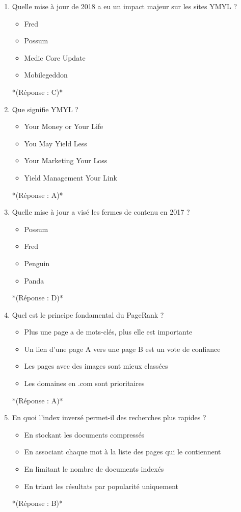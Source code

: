 \documentclass[12pt,a4paper,twoside]{report}
\begin{document}
\begin{enumerate}
\item Quelle mise à jour de 2018 a eu un impact majeur sur les sites YMYL ?
\begin{itemize}
\item[A)] Fred
\item[B)] Possum
\item[C)] Medic Core Update
\item[D)] Mobilegeddon
\end{itemize}
*(Réponse : C)*

\item Que signifie YMYL ?
\begin{itemize}
\item[A)] Your Money or Your Life
\item[B)] You May Yield Less
\item[C)] Your Marketing Your Loss
\item[D)] Yield Management Your Link
\end{itemize}
*(Réponse : A)*

\item Quelle mise à jour a visé les fermes de contenu en 2017 ?
\begin{itemize}
\item[A)] Possum
\item[B)] Fred
\item[C)] Penguin
\item[D)] Panda
\end{itemize}
*(Réponse : D)*

\item Quel est le principe fondamental du PageRank ?
\begin{itemize}
\item[A)] Plus une page a de mots-clés, plus elle est importante
\item[B)] Un lien d'une page A vers une page B est un vote de confiance
\item[C)] Les pages avec des images sont mieux classées
\item[D)] Les domaines en .com sont prioritaires
\end{itemize}
*(Réponse : A)*

\item En quoi l'index inversé permet-il des recherches plus rapides ?
\begin{itemize}
\item[A)] En stockant les documents compressés
\item[B)] En associant chaque mot à la liste des pages qui le contiennent
\item[C)] En limitant le nombre de documents indexés
\item[D)] En triant les résultats par popularité uniquement
\end{itemize}
*(Réponse : B)*


\end{enumerate}
\end{document}
